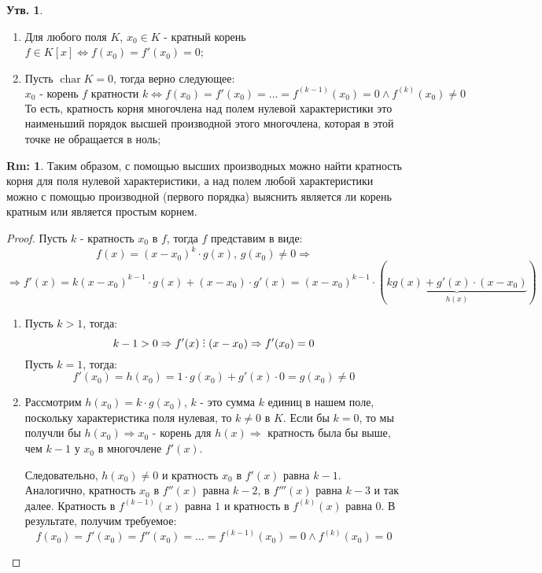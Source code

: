 \documentclass[12pt]{article}
\theoremstyle{definition}
\newtheorem{rem}{Rm:}
\newtheorem{prop}{Утв.}
\DeclareRobustCommand{\divby}{%
	\mathrel{\text{\vbox{\baselineskip.65ex\lineskiplimit0pt\hbox{.}\hbox{.}\hbox{.}}}}%
}
\DeclareMathOperator{\Char}{\operatorname{char}}
\begin{document}
\begin{prop}\hfill
	\begin{enumerate}[label=\arabic*)]
		\item Для любого поля $K$, $x_0 \in K$ - кратный корень $f \in K[x] \Leftrightarrow f(x_0) = f'(x_0) = 0$;
		\item Пусть $\Char{K} = 0$, тогда верно следующее: 
		$$
			x_0 \text{ - корень } f \text{ кратности }k \Leftrightarrow f(x_0) = f'(x_0) = \dotsc = f^{(k-1)}(x_0) = 0 \wedge f^{(k)}(x_0) \neq 0
		$$
		То есть, кратность корня многочлена над полем нулевой характеристики это наименьший порядок высшей производной этого многочлена, которая в этой точке не обращается в ноль;
	\end{enumerate}
\end{prop}
\begin{rem}
	Таким образом, с помощью высших производных можно найти кратность корня для поля нулевой характеристики, а над полем любой характеристики можно с помощью производной (первого порядка) выяснить является ли корень кратным или является простым корнем.
\end{rem}
\begin{proof}
	Пусть $k$ - кратность $x_0$ в $f$, тогда $f$ представим в виде:
	$$
		f(x) = (x - x_0)^k{\cdot}g(x), \, g(x_0) \neq 0 \Rightarrow 
	$$
	$$
		\Rightarrow f'(x) = k(x - x_0)^{k-1}{\cdot}g(x) + (x - x_0){\cdot}g'(x) = (x - x_0)^{k-1}{\cdot}(\underbrace{kg(x) + g'(x){\cdot}(x - x_0)}_{h(x)})
	$$
	\begin{enumerate}[label=\arabic*)]
		\item Пусть $k > 1$, тогда: 
		$$
			k - 1> 0 \Rightarrow f'(x) \divby (x - x_0) \Rightarrow f'(x_0) = 0
		$$ 
		Пусть $k = 1$, тогда: 
		$$
			f'(x_0) = h(x_0) = 1{\cdot}g(x_0) + g'(x){\cdot}0 = g(x_0) \neq 0
		$$
		\item Рассмотрим $h(x_0)= k{\cdot}g(x_0)$, $k$ - это сумма $k$ единиц в нашем поле, поскольку характеристика поля нулевая, то $k \neq 0$ в $K$. Если бы $k = 0$, то мы получли бы $h(x_0) \Rightarrow x_0$ - корень для $h(x) \Rightarrow$ кратность была бы выше, чем $k-1$ у $x_0$ в многочлене $f'(x)$. 
		
		Следовательно, $h(x_0) \neq 0$ и кратность $x_0$ в $f'(x)$ равна $k-1$. Аналогично, кратность $x_0$ в $f''(x)$ равна $k-2$, в $f'''(x)$ равна $k-3$ и так далее. Кратность в $f^{(k-1)}(x)$ равна $1$ и кратность в $f^{(k)}(x)$ равна $0$. В результате, получим требуемое:
		$$
			f(x_0) = f'(x_0) = f''(x_0) = \dotsc = f^{(k-1)}(x_0) = 0 \wedge f^{(k)}(x_0) = 0
		$$ 
	\end{enumerate}
\end{proof}
\end{document}
